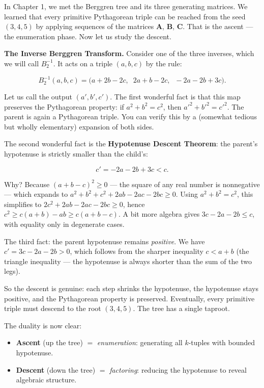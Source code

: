 \documentclass[11pt,openany]{book}
\theoremstyle{definition}
\theoremstyle{plain}
\theoremstyle{remark}
\begin{document}
In Chapter 1, we met the Berggren tree and its three generating matrices. We learned that every primitive Pythagorean triple can be reached from the seed $(3, 4, 5)$ by applying sequences of the matrices $\mathbf{A}$, $\mathbf{B}$, $\mathbf{C}$. That is the ascent — the enumeration phase. Now let us study the descent.

\textbf{The Inverse Berggren Transform.} Consider one of the three inverses, which we will call $B_2^{-1}$. It acts on a triple $(a, b, c)$ by the rule:

$$B_2^{-1}(a, b, c) = \big(a + 2b - 2c,\;\; 2a + b - 2c,\;\; -2a - 2b + 3c\big).$$

Let us call the output $(a', b', c')$. The first wonderful fact is that this map preserves the Pythagorean property: if $a^2 + b^2 = c^2$, then $a'^2 + b'^2 = c'^2$. The parent is again a Pythagorean triple. You can verify this by a (somewhat tedious but wholly elementary) expansion of both sides.

The second wonderful fact is the \textbf{Hypotenuse Descent Theorem}: the parent's hypotenuse is strictly smaller than the child's:

$$c' = -2a - 2b + 3c < c.$$

Why? Because $(a + b - c)^2 \geq 0$ — the square of any real number is nonnegative — which expands to $a^2 + b^2 + c^2 + 2ab - 2ac - 2bc \geq 0$. Using $a^2 + b^2 = c^2$, this simplifies to $2c^2 + 2ab - 2ac - 2bc \geq 0$, hence $c^2 \geq c(a + b) - ab \geq c(a + b - c)$. A bit more algebra gives $3c - 2a - 2b \leq c$, with equality only in degenerate cases.

The third fact: the parent hypotenuse remains \textit{positive}. We have $c' = 3c - 2a - 2b > 0$, which follows from the sharper inequality $c < a + b$ (the triangle inequality — the hypotenuse is always shorter than the sum of the two legs).

So the descent is genuine: each step shrinks the hypotenuse, the hypotenuse stays positive, and the Pythagorean property is preserved. Eventually, every primitive triple must descend to the root $(3, 4, 5)$. The tree has a single taproot.

The duality is now clear:

\begin{itemize}
\item \textbf{Ascent} (up the tree) $=$ \textit{enumeration}: generating all $k$-tuples with bounded hypotenuse.
\item \textbf{Descent} (down the tree) $=$ \textit{factoring}: reducing the hypotenuse to reveal algebraic structure.
\end{itemize}
\end{document}
